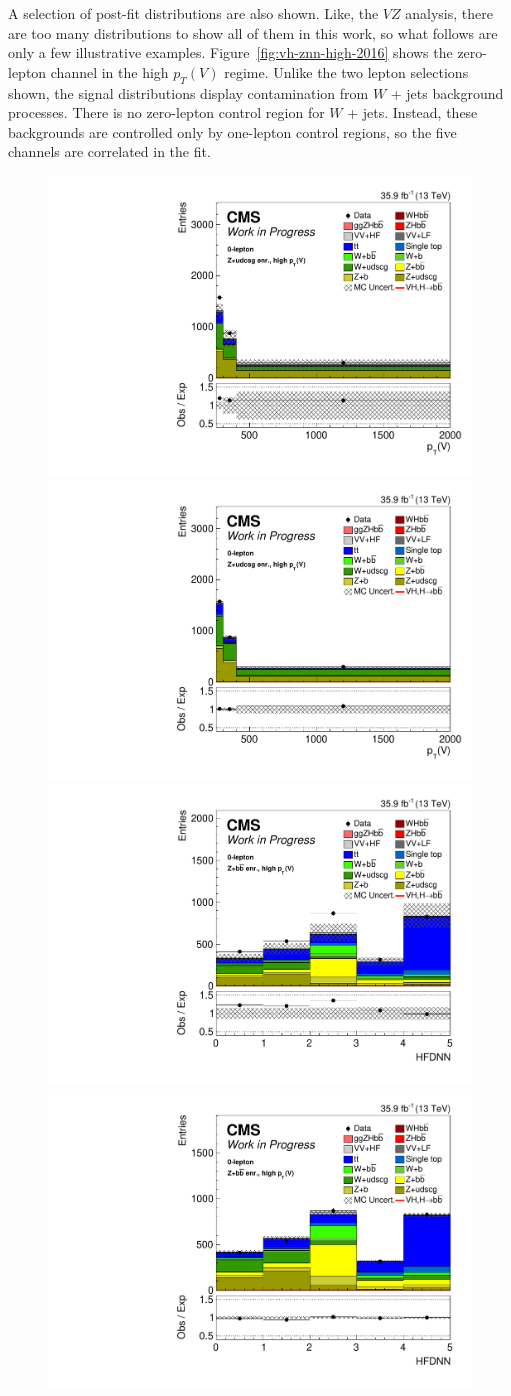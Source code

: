 A selection of post-fit distributions are also shown.
Like, the $V\!Z$ analysis, there are too many distributions to show all of them in this work,
so what follows are only a few illustrative examples.
Figure~\ref{fig:vh-znn-high-2016} shows the zero-lepton channel in the high $p_T(V)$ regime.
Unlike the two lepton selections shown,
the signal distributions display contamination from $W$ + jets background processes.
There is no zero-lepton control region for $W$ + jets.
Instead, these backgrounds are controlled only by one-lepton control regions,
so the five channels are correlated in the fit.
%
\begin{figure}
  \centering
  \includegraphics[width=0.35\linewidth]{figures/210322_STXSfine_400split_unblinded_Xbb_025349b6_postfitplots/plot_shapes_vhbb_Znn_14_13TeV2016_prefit.pdf}
  \includegraphics[width=0.35\linewidth]{figures/210322_STXSfine_400split_unblinded_Xbb_025349b6_postfitplots/plot_shapes_vhbb_Znn_14_13TeV2016_postfit.pdf} \\
  \includegraphics[width=0.35\linewidth]{figures/210322_STXSfine_400split_unblinded_Xbb_025349b6_postfitplots/plot_shapes_vhbb_Znn_15_13TeV2016_prefit.pdf}
  \includegraphics[width=0.35\linewidth]{figures/210322_STXSfine_400split_unblinded_Xbb_025349b6_postfitplots/plot_shapes_vhbb_Znn_15_13TeV2016_postfit.pdf} \\

\end{figure}

